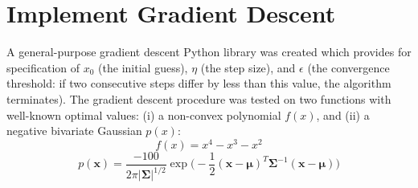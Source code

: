 \documentclass{article}
\begin{document}
 



\section{Implement Gradient Descent}
A general-purpose gradient descent Python library was created which provides for specification of $x_0$ (the initial guess), $\eta$ (the step size), and $\epsilon$ (the convergence threshold: if two consecutive steps differ by less than this value, the algorithm terminates).  The gradient descent procedure was tested on two functions with well-known optimal values: (i)  a non-convex polynomial $f(x)$, and (ii) a negative bivariate Gaussian $p(x)$:
$$f(x) = x^4 - x^3 -x^2$$
$$p(\mathbf{x}) = \frac{-100}{2\pi|\mathbf{\Sigma}|^{1/2}}\exp{\bigg(-\frac{1}{2} (\mathbf{x} - \boldsymbol{\mu})^T\mathbf{\Sigma}^{-1} (\mathbf{x} - \boldsymbol{\mu}) \bigg)}$$
\end{document}
